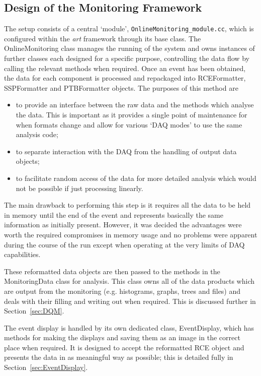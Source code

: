 \subsection{Design of the Monitoring Framework}\label{sec:MonitoringFrameworkDesign}

The setup consists of a central `module', \texttt{OnlineMonitoring\_module.cc}, which is configured within the \textit{art} framework through its base class.  The OnlineMonitoring class manages the running of the system and owns instances of further classes each designed for a specific purpose, controlling the data flow by calling the relevant methods when required.  Once an event has been obtained, the data for each component is processed and repackaged into RCEFormatter, SSPFormatter and PTBFormatter objects.  The purposes of this method are
\begin{itemize}
\item to provide an interface between the raw data and the methods which analyse the data.  This is important as it provides a single point of maintenance for when formats change and allow for various `DAQ modes' to use the same analysis code;
\item to separate interaction with the DAQ from the handling of output data objects;
\item to facilitate random access of the data for more detailed analysis which would not be possible if just processing linearly.
\end{itemize}
The main drawback to performing this step is it requires all the data to be held in memory until the end of the event and represents basically the same information as initially present.  However, it was decided the advantages were worth the required compromises in memory usage and no problems were apparent during the course of the run except when operating at the very limits of DAQ capabilities.

These reformatted data objects are then passed to the methods in the MonitoringData class for analysis.  This class owns all of the data products which are output from the monitoring (e.g. histograms, graphs, trees and files) and deals with their filling and writing out when required.  This is discussed further in Section~\ref{sec:DQM}.

The event display is handled by its own dedicated class, EventDisplay, which has methods for making the displays and saving them as an image in the correct place when required.  It is designed to accept the reformatted RCE object and presents the data in as meaningful way as possible; this is detailed fully in Section~\ref{sec:EventDisplay}.


